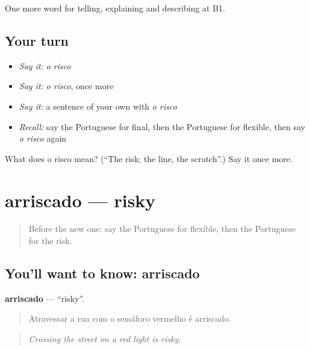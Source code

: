 \begin{grammarlens}[title={What you've built}]
One more word for telling, explaining and describing at B1.
\end{grammarlens}

\subsection*{Your turn}
\begin{itemize}
\raggedright
  \item \emph{Say it:} \emph{o risco}
  \item \emph{Say it:} \emph{o risco}, once more
  \item \emph{Say it:} a sentence of your own with \emph{o risco}
  \item \emph{Recall:} say the Portuguese for final, then the Portuguese for flexible, then say \emph{o risco} again
\end{itemize}

\begin{tcolorbox}[breakable,colback=teal!4,colframe=teal!35!black,title={Before you move on}]
What does o risco mean? (\textquotedblleft{}The risk; the line, the scratch\textquotedblright{}.) Say it once more.
\end{tcolorbox}
\section[arriscado]{arriscado — risky}

\label{lesson:PT-C373-arriscado}



\begin{quote}
Before the new one: say the Portuguese for flexible, then the Portuguese for the risk.
\end{quote}

\subsection*{You'll want to know: arriscado}
\textbf{arriscado} — \textquotedblleft{}risky\textquotedblright{}.

\begin{quote}
Atravessar a rua com o semáforo vermelho é arriscado.
\end{quote}

\begin{quote}
\emph{Crossing the street on a red light is risky.}
\end{quote}

